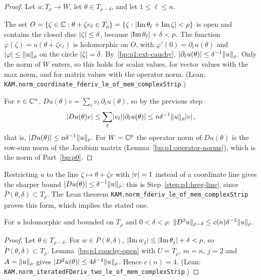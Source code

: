 \begin{proof}
Let $u:T_\rho\to W$, let $\theta\in T_{\rho-\delta}$, and let $1\le\ell\le n$.

\label{step:p1:cs-coordinate}
The set $O=\{\zeta\in\mathbb{C}:\theta+\zeta e_\ell\in T_\rho\}=\{\zeta:\lvert \operatorname{Im}\theta_\ell+
\operatorname{Im}\zeta\rvert<\rho\}$ is open and contains the closed disc $\lvert \zeta\rvert\le\delta$, because
$\lvert \operatorname{Im}\theta_\ell\rvert+\delta<\rho$. The function $\varphi(\zeta)=u(\theta+\zeta e_\ell)$ is
holomorphic on $O$, with $\varphi'(0)=\partial_\ell u(\theta)$ and $\lvert \varphi\rvert\le\lVert u\rVert_\rho$ on the
circle $\lvert \zeta\rvert=\delta$. By~\ref{bp:p1:ext-cauchy}, $\lvert \partial_\ell u(\theta)\rvert\le\delta^{-1}
\lVert u\rVert_\rho$. Only the norm of $W$ enters, so this holds for scalar values, for vector values with the
max norm, and for matrix values with the operator norm. (Lean:
\nolinkurl{KAM.norm_coordinate_fderiv_le_of_mem_complexStrip}.)

\label{step:p1:cs-full}
For $v\in\mathbb{C}^n$, $Du(\theta)v=\sum_\ell v_\ell\,\partial_\ell u(\theta)$, so by the previous step
\begin{equation*}
\lvert Du(\theta)v\rvert\le\sum_\ell\lvert v_\ell\rvert\lvert \partial_\ell u(\theta)\rvert\le n\delta^{-1}\lVert u\rVert_\rho\lvert v\rvert\,,
\end{equation*}
that is, $\lvert Du(\theta)\rvert\le n\delta^{-1}\lVert u\rVert_\rho$. For $W=\mathbb{C}^p$ the operator norm of $Du(\theta)$ is
the row-sum norm of the Jacobian matrix (Lemma~\ref{bp:p1:operator-norms}), which is the norm of
Part~\ref{bp:p0}.
\end{proof}

Restricting $u$ to the line $\zeta\mapsto\theta+\zeta v$ with $\lvert v\rvert=1$ instead of a coordinate line
gives the sharper bound $\lvert Du(\theta)\rvert\le\delta^{-1}\lVert u\rVert_\rho$: this is
Step~\ref{step:p1:hreg-line}, since $\bar P(\theta,\delta)\subset T_\rho$. The Lean theorem
\nolinkurl{KAM.norm_fderiv_le_of_mem_complexStrip} proves this form, which implies the stated one.

\begin{lemma}\label{bp:p1:cauchy-strip-2}
For $u$ holomorphic and bounded on $T_\rho$ and $0<\delta<\rho$: $\lVert D^2u\rVert_{\rho-\delta}\le c(n)\delta^{-2}\lVert u\rVert_\rho$.
\end{lemma}

\begin{proof}
\label{step:p1:cs2-polydisc}
Let $\theta\in T_{\rho-\delta}$. For $w\in\bar P(\theta,\delta)$,
$\lvert \operatorname{Im}w_j\rvert\le\lvert \operatorname{Im}\theta_j\rvert+\delta<\rho$, so $\bar P(\theta,\delta)\subset
T_\rho$. Lemma~\ref{bp:p1:cauchy-open} with $U=T_\rho$, $m=n$, $j=2$ and $A=\lVert u\rVert_\rho$ gives
$\lvert D^2u(\theta)\rvert\le4\delta^{-2}\lVert u\rVert_\rho$. Hence $c(n)=4$. (Lean:
\nolinkurl{KAM.norm_iteratedFDeriv_two_le_of_mem_complexStrip}.)
\end{proof}


